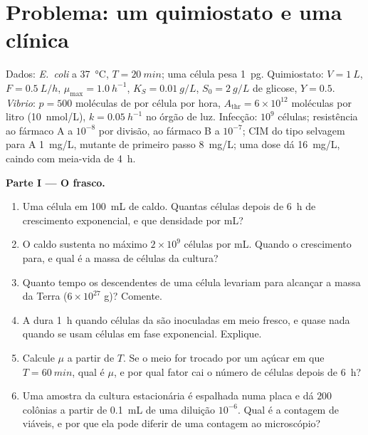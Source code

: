 \section{Problema: um quimiostato e uma clínica}

\begin{problem}
\label{pb:b3:bacteriology:1}
Dados: \emph{E.~coli} a \qty{37}{\celsius}, $T = \qty{20}{min}$; uma
célula pesa \qty{1}{pg}. Quimiostato: $V = \qty{1}{L}$,
$F = \qty{0.5}{L/h}$, $\mu_{\max} = \qty{1.0}{h^{-1}}$,
$K_{S} = \qty{0.01}{g/L}$, $S_{0} =
\qty{2}{g/L}$ de glicose,
$Y = 0.5$. \emph{Vibrio}: $p = 500$ moléculas de  por célula
por hora, $A_{\text{thr}} = 6\times 10^{12}$ moléculas por litro
(\qty{10}{nmol/L}), $k = \qty{0.05}{h^{-1}}$ no órgão de luz. Infecção:
$10^{9}$ células; resistência ao fármaco A a $10^{-8}$ por divisão, ao
fármaco B a $10^{-7}$; CIM do tipo selvagem para A \qty{1}{mg/L},
mutante de primeiro passo \qty{8}{mg/L}; uma dose dá \qty{16}{mg/L},
caindo com meia-vida de \qty{4}{h}.

\medskip
\noindent\textbf{Parte I --- O frasco.}
\begin{enumerate}
  \item Uma célula em \qty{100}{mL} de caldo. Quantas células depois de
        \qty{6}{h} de crescimento exponencial, e que densidade por mL?
  \item O caldo sustenta no máximo $2\times 10^{9}$ células por mL.
        Quando o crescimento para, e qual é a massa de células da
        cultura?
  \item Quanto tempo os descendentes de uma célula levariam para
        alcançar a massa da Terra ($6\times 10^{27}$ g)? Comente.
  \item A  dura \qty{1}{h} quando células da  são inoculadas em meio fresco, e quase nada quando
        se usam células em fase exponencial. Explique.
  \item Calcule $\mu$ a partir de $T$. Se o meio for trocado por um
        açúcar em que $T = \qty{60}{min}$, qual é $\mu$, e por qual
        fator cai o número de células depois de \qty{6}{h}?
  \item Uma amostra da cultura estacionária é espalhada numa placa e dá
        $200$ colônias a partir de \qty{0.1}{mL} de uma diluição
        $10^{-6}$. Qual é a contagem de viáveis, e por que ela pode
        diferir de uma contagem ao microscópio?
\end{enumerate}


\end{problem}

